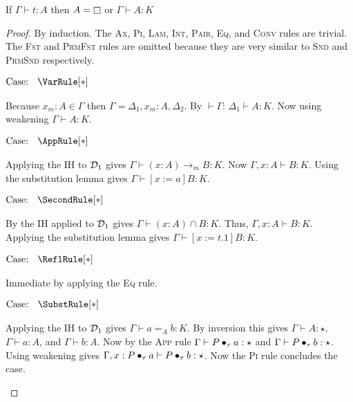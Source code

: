 \begin{theorem}[Classification]
    If $\Gamma \vdash t : A$ then $A = \kind$ or $\Gamma \vdash A : K$
    \label{lem:2:classification}
\end{theorem}
\begin{proof}
    By induction.
    The \textsc{Ax}, \textsc{Pi}, \textsc{Lam}, \textsc{Int}, \textsc{Pair}, \textsc{Eq}, and \textsc{Conv} rules are trivial.
    The \textsc{Fst} and \textsc{PrmFst} rules are omitted because they are very similar to \textsc{Snd} and \textsc{PrmSnd} respectively.

    $\text{Case: }\begin{array}{c} \VarRule[*] \end{array}$
    \begin{proofcase}
        Because $x_m : A \in \Gamma$ then $\Gamma = \Delta_1, x_m : A, \Delta_2$.
        By $\vdash \Gamma$: $\Delta_1 \vdash A : K$.
        Now using weakening $\Gamma \vdash A : K$.
    \end{proofcase}

    $\text{Case: }\begin{array}{c} \AppRule[*] \end{array}$
    \begin{proofcase}
        Applying the IH to $\mathcal{D}_{1}$ gives $\Gamma \vdash (x : A) \to_m B : K$.
        Now $\Gamma, x : A \vdash B : K$.
        Using the substitution lemma gives $\Gamma \vdash [x := a]B : K$.
    \end{proofcase}

    $\text{Case: }\begin{array}{c} \SecondRule[*] \end{array}$
    \begin{proofcase}
        By the IH applied to $\mathcal{D}_{1}$ gives $\Gamma \vdash (x : A )\cap B : K$.
        Thus, $\Gamma, x : A \vdash B : K$.
        Applying the substitution lemma gives $\Gamma \vdash [x := t.1]B : K$.
    \end{proofcase}

    $\text{Case: }\begin{array}{c} \ReflRule[*] \end{array}$
    \begin{proofcase}
        Immediate by applying the \textsc{Eq} rule.
    \end{proofcase}

    $\text{Case: }\begin{array}{c} \SubstRule[*] \end{array}$
    \begin{proofcase}
        Applying the IH to $\mathcal{D}_{1}$ gives $\Gamma \vdash a =_A b : K$.
        By inversion this gives $\Gamma \vdash A : \star$, $\Gamma \vdash a : A$, and $\Gamma \vdash b : A$.
        Now by the \textsc{App} rule $\Gamma \vdash P \bullet_{\tau} a : \star$ and $\Gamma \vdash P \bullet_{\tau} b : \star$.
        Using weakening gives $\Gamma, x : P \bullet_{\tau} a \vdash P \bullet_{\tau} b : \star$.
        Now the \textsc{Pi} rule concludes the case.
    \end{proofcase}


\end{proof}
